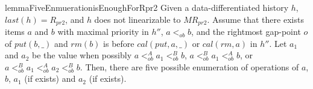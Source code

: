\begin{restatable}{lemma}{FiveEnmuerationisEnoughForRpr2}
\label{lemma:five enumeration is enough for Rpr2}
Given a data-differentiated history $h$, $\textit{last}(h) = R_{\textit{pr2}}$, and $h$ does not linearizable to $\textit{MR}_{\textit{pr2}}$. Assume that there exists items $a$ and $b$ with maximal priority in $h''$, $a <_{\textit{ob}} b$, and the rightmost gap-point $o$ of $\textit{put}(b,\_)$ and $\textit{rm}(b)$ is before $\textit{cal}(\textit{put},a,\_)$ or $\textit{cal}(\textit{rm},a)$ in $h''$. Let $a_1$ and $a_2$ be the value when possibly $a <_{\textit{ob}}^A a_1 <_{\textit{ob}}^B b$, $a <_{\textit{ob}}^B a_1 <_{\textit{ob}}^A b$, or $a <_{\textit{ob}}^B a_1 <_{\textit{ob}}^A a_2 <_{\textit{ob}}^B b$. Then, there are five possible enumeration of operations of $a$, $b$, $a_1$ (if exists) and $a_2$ (if exists).
\end{restatable}
